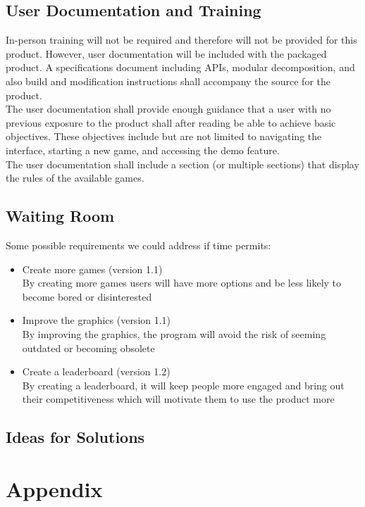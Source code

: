 \documentclass[12pt, titlepage]{article}
\begin{document}
		\subsection{User Documentation and Training}
			\indent In-person training will not be required and therefore will not be
			provided for this product. However, user documentation will be included with
			the packaged product. A specifications document including APIs, modular
			decomposition, and also build and modification instructions shall accompany
			the source for the product.\\
	 		\indent The user documentation shall provide enough guidance that a user
			with no previous exposure to the product shall after reading be able to
			achieve basic objectives. These objectives include but are not limited to
			navigating the interface, starting a new game, and accessing the demo
			feature.\\
	 		\indent The user documentation shall include a section (or multiple
			sections) that display the rules of the available games.

		\subsection{Waiting Room}		
		\indent Some possible requirements we could address if time permits:\\
		\begin{itemize}
			\itemsep0em
			\item Create more games (version 1.1)\\
			By creating more games users will have more options and be less likely to
			become bored or disinterested
			\item Improve the graphics (version 1.1) \\
			By improving the graphics, the program will avoid the risk of seeming
			outdated or becoming obsolete
			\item Create a leaderboard (version 1.2)\\
			By creating a leaderboard, it will keep people more engaged and bring out
			their competitiveness which will motivate them to use the product more
		\end{itemize}		
		\subsection{Ideas for Solutions}
		
	\newpage
	\section{Appendix}
\end{document}
